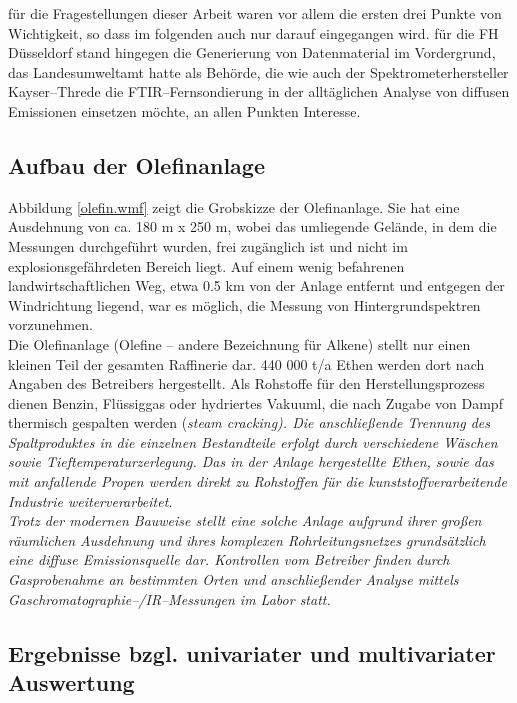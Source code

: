 für die Fragestellungen dieser Arbeit waren vor allem die ersten
drei Punkte von Wichtigkeit, so dass im folgenden auch nur darauf
eingegangen wird. für die FH Düsseldorf stand hingegen die
Generierung von Datenmaterial im Vordergrund, das Landesumweltamt
hatte als Behörde, die wie auch der Spektrometerhersteller
Kayser--Threde die FTIR--Fernsondierung in der alltäglichen
Analyse von diffusen Emissionen einsetzen möchte, an allen Punkten
Interesse.\\

\subsection{\label{raffaufbau}Aufbau der Olefinanlage }

Abbildung \ref{olefin.wmf} zeigt die Grobskizze der Olefinanlage.
Sie hat eine Ausdehnung von ca. 180 m x 250 m, wobei das
umliegende Gelände, in dem die Messungen durchgeführt wurden, frei
zugänglich ist und nicht im explosionsgefährdeten Bereich liegt.
Auf einem wenig befahrenen landwirtschaftlichen Weg, etwa 0.5 km
von der Anlage entfernt und entgegen der Windrichtung liegend, war
es möglich, die Messung von Hintergrundspektren vorzunehmen.\\

Die Olefinanlage (Olefine -- andere Bezeichnung für Alkene) stellt
nur einen kleinen Teil der gesamten Raffinerie dar. 440 000 t/a
Ethen werden dort nach Angaben des Betreibers hergestellt. Als
Rohstoffe für den Herstellungsprozess dienen Benzin, Flüssiggas
oder hydriertes Vakuuml, die nach Zugabe von Dampf thermisch
gespalten werden (\it steam cracking\rm ). Die anschließende
Trennung des Spaltproduktes in die einzelnen Bestandteile erfolgt
durch verschiedene Wäschen sowie Tieftemperaturzerlegung. Das in
der Anlage hergestellte Ethen, sowie das mit anfallende Propen
werden direkt zu Rohstoffen für die kunststoffverarbeitende
Industrie weiterverarbeitet.\\

Trotz der modernen Bauweise stellt eine solche Anlage aufgrund
ihrer großen räumlichen Ausdehnung und ihres komplexen
Rohrleitungsnetzes grundsätzlich eine diffuse Emissionsquelle dar.
Kontrollen vom Betreiber finden durch Gasprobenahme an bestimmten
Orten und anschließender Analyse mittels
Gaschromatographie--/IR--Messungen im Labor statt.

\subsection{\label{raffergebnisse}Ergebnisse bzgl. univariater und
multivariater Auswertung}

